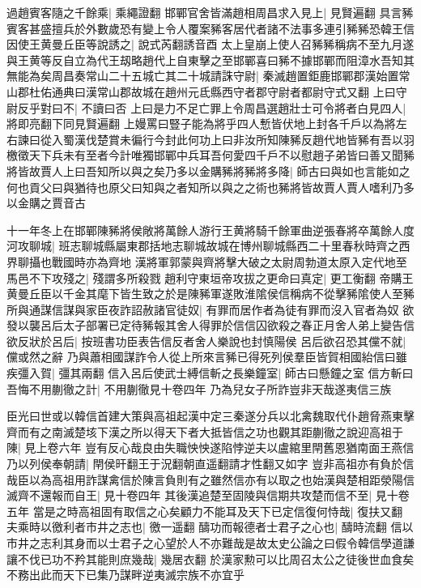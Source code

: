 過趙賓客隨之千餘乘|{
	乘繩證翻}
邯鄲官舍皆滿趙相周昌求入見上|{
	見賢遍翻}
具言豨賓客甚盛擅兵於外數歲恐有變上令人覆案豨客居代者諸不法事多連引豨豨恐韓王信因使王黄曼丘臣等說誘之|{
	說式芮翻誘音酉}
太上皇崩上使人召豨豨稱病不至九月遂與王黄等反自立為代王刼略趙代上自東擊之至邯鄲喜曰豨不據邯鄲而阻漳水吾知其無能為矣周昌奏常山二十五城亡其二十城請誅守尉|{
	秦滅趙置鉅鹿邯鄲郡漢始置常山郡杜佑通典曰漢常山郡故城在趙州元氐縣西守者郡守尉者都尉守式又翻}
上曰守尉反乎對曰不|{
	不讀曰否}
上曰是力不足亡罪上令周昌選趙壯士可令將者白見四人|{
	將即亮翻下同見賢遍翻}
上嫚罵曰豎子能為將乎四人慙皆伏地上封各千戶以為將左右諫曰從入蜀漢伐楚賞未徧行今封此何功上曰非汝所知陳豨反趙代地皆豨有吾以羽檄徵天下兵未有至者今計唯獨邯鄲中兵耳吾何愛四千戶不以慰趙子弟皆曰善又聞豨將皆故賈人上曰吾知所以與之矣乃多以金購豨將豨將多降|{
	師古曰與如也言能如之何也貢父曰與猶待也原父曰知與之者知所以與之之術也豨將皆故賈人賈人嗜利乃多以金購之賈音古}


十一年冬上在邯鄲陳豨將侯敞將萬餘人游行王黄將騎千餘軍曲逆張春將卒萬餘人度河攻聊城|{
	班志聊城縣屬東郡括地志聊城故城在博州聊城縣西二十里春秋時齊之西界聊攝也戰國時亦為齊地}
漢將軍郭蒙與齊將擊大破之太尉周勃道太原入定代地至馬邑不下攻殘之|{
	殘謂多所殺戮}
趙利守東垣帝攻拔之更命曰真定|{
	更工衡翻}
帝購王黄曼丘臣以千金其麾下皆生致之於是陳豨軍遂敗淮隂侯信稱病不從擊豨隂使人至豨所與通謀信謀與家臣夜詐詔赦諸官徒奴|{
	有罪而居作者為徒有罪而沒入官者為奴}
欲發以襲呂后太子部署已定待豨報其舍人得罪於信信囚欲殺之春正月舍人弟上變告信欲反狀於呂后|{
	按班書功臣表告信反者舍人樂說也封慎陽侯}
呂后欲召恐其儻不就|{
	儻或然之辭}
乃與蕭相國謀詐令人從上所來言豨已得死列侯羣臣皆賀相國紿信曰雖疾彊入賀|{
	彊其兩翻}
信入呂后使武士縛信斬之長樂鐘室|{
	師古曰懸鐘之室}
信方斬曰吾悔不用蒯徹之計|{
	不用蒯徹見十卷四年}
乃為兒女子所詐豈非天哉遂夷信三族

臣光曰世或以韓信首建大策與高祖起漢中定三秦遂分兵以北禽魏取代仆趙脅燕東擊齊而有之南滅楚垓下漢之所以得天下者大抵皆信之功也觀其距蒯徹之說迎高祖于陳|{
	見上卷六年}
豈有反心哉良由失職怏怏遂陷悖逆夫以盧綰里閈舊恩猶南面王燕信乃以列侯奉朝請|{
	閈侯旰翻王于況翻朝直遥翻請才性翻又如字}
豈非高祖亦有負於信哉臣以為高祖用詐謀禽信於陳言負則有之雖然信亦有以取之也始漢與楚相距滎陽信滅齊不還報而自王|{
	見十卷四年}
其後漢追楚至固陵與信期共攻楚而信不至|{
	見十卷五年}
當是之時高祖固有取信之心矣顧力不能耳及天下已定信復何恃哉|{
	復扶又翻}
夫乘時以徼利者市井之志也|{
	徼一遥翻}
醻功而報德者士君子之心也|{
	醻時流翻}
信以市井之志利其身而以士君子之心望於人不亦難哉是故太史公論之曰假令韓信學道謙讓不伐已功不矜其能則庶幾哉|{
	幾居衣翻}
於漢家勲可以比周召太公之徒後世血食矣不務出此而天下已集乃謀畔逆夷滅宗族不亦宜乎

